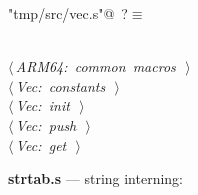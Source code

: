 \documentclass[11pt,a4paper,twoside,openright,DIV=15]{scrbook}
\theoremstyle{definition}
\theoremstyle{plain}
\theoremstyle{remark}
\begin{document}
\begin{flushleft} \small
\begin{minipage}{\linewidth}\label{scrap91}\raggedright\small
{} \verb@"tmp/src/vec.s"@\nobreak\ {\footnotesize {?}}$\equiv$
\vspace{-1ex}
\begin{list}{}{} \item
\mbox{}\verb@@\\
\mbox{}\verb@@\hbox{$\langle\,${\itshape ARM64: common macros}\nobreak\ {\footnotesize {}}$\,\rangle$}\verb@@\\
\mbox{}\verb@@\hbox{$\langle\,${\itshape Vec: constants}\nobreak\ {\footnotesize {}}$\,\rangle$}\verb@@\\
\mbox{}\verb@@\hbox{$\langle\,${\itshape Vec: init}\nobreak\ {\footnotesize {}}$\,\rangle$}\verb@@\\
\mbox{}\verb@@\hbox{$\langle\,${\itshape Vec: push}\nobreak\ {\footnotesize {}}$\,\rangle$}\verb@@\\
\mbox{}\verb@@\hbox{$\langle\,${\itshape Vec: get}\nobreak\ {\footnotesize {}}$\,\rangle$}\verb@@\\
\mbox{}\verb@@{\NWsep}
\end{list}
\vspace{-1.5ex}
\footnotesize
\begin{list}{}{\setlength{\itemsep}{-\parsep}\setlength{\itemindent}{-\leftmargin}}

\item{}
\end{list}
\end{minipage}\vspace{4ex}
\end{flushleft}
\noindent\textbf{strtab.s} --- string interning:
\end{document}
